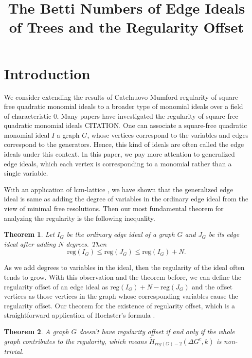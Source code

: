 \documentclass[dvipsnames,10pt]{article}
\title{\Large \textbf{The Betti Numbers of Edge Ideals of Trees and the Regularity Offset}}
\date{}
\newtheorem{theorem}{Theorem}[section]
\begin{document}
\maketitle
\section{Introduction}
We consider extending the results of Catelnuovo-Mumford regularity of square-free quadratic monomial ideals to a broader type of monomial ideals over a field of characteristic 0. Many papers have investigated the regularity of square-free quadratic monomial ideals CITATION. One can associate a square-free quadratic monomial ideal $I$ a graph $G$, whose vertices correspond to the variables and edges correspond to the generators. Hence, this kind of ideals are often called the edge ideals under this context. In this paper, we pay more attention to generalized edge ideals, which each vertex is corresponding to a monomial rather than a single variable. 

With an application of lcm-lattice \cite{welker1999lcm}, we have shown that the generalized edge ideal is same as adding the degree of variables in the ordinary edge ideal from the view of minimal free resolutions. Then our most fundamental theorem for analyzing the regularity is the following inequality.
\begin{theorem}
    Let $I_G$ be the ordinary edge ideal of a graph $G$ and $J_G$ be its edge ideal after adding $N$ degrees. Then
    \begin{equation*}
        \mathrm{reg}(I_G) \leqslant \mathrm{reg} (J_G) \leqslant \mathrm{reg} (I_G)+N.
    \end{equation*}
\end{theorem}

As we add degrees to variables in the ideal, then the regularity of the ideal often tends to grow. With this observation and the theorem before, we can define the regularity offset of an edge ideal as $\mathrm{reg} (I_G)+N-\mathrm{reg} (J_G)$ and the offset vertices as those vertices in the graph whose corresponding variables cause the regularity offset. Our theorem for the existence of regularity offset, which is a straightforward application of Hochster's formula \cite{hochster1977cohen}.

\begin{theorem}
    A graph $G$ doesn't have regularity offset if and only if the whole graph contributes to the regularity, which means $\widetilde{H}_{reg(G)-2}\left(\Delta G^c, k\right)$ is non-trivial.
\end{theorem}
\end{document}

